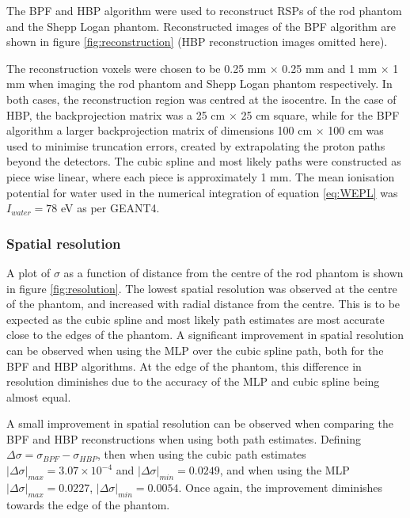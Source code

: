 \documentclass[11pt,a4paper]{article}
\begin{document}
The BPF and HBP algorithm were used to reconstruct RSPs of the rod phantom and the Shepp Logan phantom. Reconstructed images of the BPF algorithm are shown in figure \ref{fig:reconstruction} (HBP reconstruction images omitted here). 

The reconstruction voxels were chosen to be 0.25 mm $\times $ 0.25 mm and 1 mm $\times$ 1 mm when imaging the rod phantom and Shepp Logan phantom respectively. In both cases, the reconstruction region was centred at the isocentre. In the case of HBP, the backprojection matrix was a 25 cm $\times$ 25 cm square, while for the BPF algorithm a larger backprojection matrix of dimensions 100 cm $\times$ 100 cm was used to minimise truncation errors, created by extrapolating the proton paths beyond the detectors. The cubic spline and most likely paths were constructed as piece wise linear, where each piece is approximately 1 mm. The mean ionisation potential for water used in the numerical integration of equation \ref{eq:WEPL} was $I_{water} = 78$ eV as per GEANT4.

\subsubsection{Spatial resolution}
\label{sec:spatialresolution}
A plot of $\sigma$ as a function of distance from the centre of the rod phantom is shown in figure \ref{fig:resolution}. The lowest spatial resolution was observed at the centre of the phantom, and increased with radial distance from the centre. This is to be expected as the cubic spline and most likely path estimates are most accurate close to the edges of the phantom. A significant improvement in spatial resolution can be observed when using the MLP over the cubic spline path, both for the BPF and HBP algorithms. At the edge of the phantom, this difference in resolution diminishes due to the accuracy of the MLP and cubic spline being almost equal.

A small improvement in spatial resolution can be observed when comparing the BPF and HBP reconstructions when using both path estimates. Defining $\Delta \sigma = \sigma_{BPF} - \sigma_{HBP}$, then when using the cubic path estimates $|\Delta \sigma|_{max} =3.07 \times 10^{-4}$ and $|\Delta \sigma|_{min} = 0.0249$, and when using the MLP $|\Delta \sigma|_{max} = 0.0227$, $|\Delta \sigma|_{min} = 0.0054$. Once again, the improvement diminishes towards the edge of the phantom.
\end{document}
